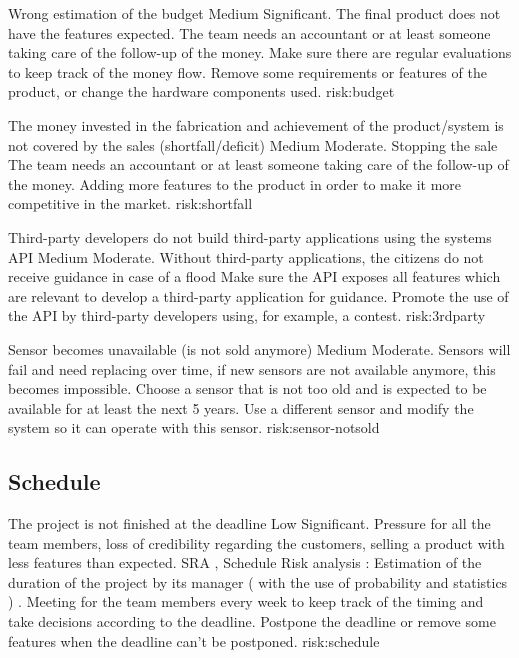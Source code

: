 {Wrong estimation of the budget}
{Medium}
{Significant. The final product does not have the features expected.}
{The team needs an accountant or at least someone taking care of the follow-up of the money. Make sure there are regular evaluations to keep track of the money flow.}
{Remove some requirements or features of the product, or change the hardware components used.}
{risk:budget}

{The money invested in the fabrication and achievement of the product/system is not covered by the sales (shortfall/deficit)}
{Medium}
{Moderate. Stopping the sale}
{The team needs an accountant or at least someone taking care of the follow-up of the money.}
{Adding more features to the product in order to make it more competitive in the market.}
{risk:shortfall}

{Third-party developers do not build third-party applications using the systems API}
{Medium}
{Moderate. Without third-party applications, the citizens do not receive guidance in case of a flood}
{ Make sure the API exposes all features which are relevant to develop a third-party application for guidance. }
{ Promote the use of the API by third-party developers using, for example, a contest. }
{risk:3rdparty}

	
{Sensor becomes unavailable (is not sold anymore)}
{Medium}
{Moderate. Sensors will fail and need replacing over time, if new sensors are not available anymore, this becomes impossible.}
{ Choose a sensor that is not too old and is expected to be available for at least the next 5 years. }
{ Use a different sensor and modify the system so it can operate with this sensor. }
{risk:sensor-notsold}



\subsection{Schedule}
{The project is not finished at the deadline}
{Low}
{Significant. Pressure for all the team members, loss of credibility regarding the customers, selling a product with less features than expected.}
{ SRA , Schedule Risk analysis : Estimation of the duration of the project by its manager ( with the use of probability and statistics ) . Meeting for the team members every week to keep track of the timing and take decisions according to the deadline. }
{ Postpone the deadline or remove some features when the deadline can't be postponed. }
{risk:schedule}